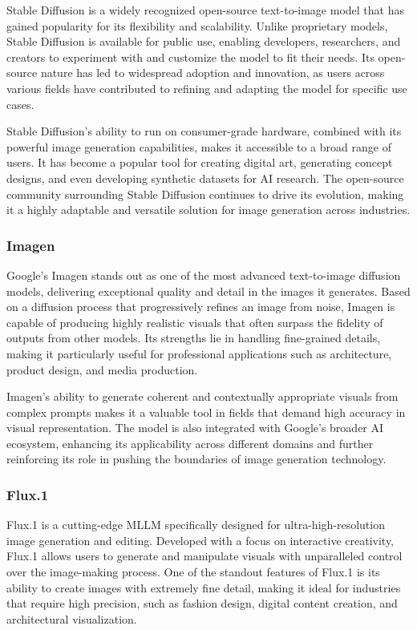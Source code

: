 Stable Diffusion \cite{StableDiffusion} is a widely recognized open-source text-to-image model that has gained popularity for its flexibility and scalability. Unlike proprietary models, Stable Diffusion is available for public use, enabling developers, researchers, and creators to experiment with and customize the model to fit their needs. Its open-source nature has led to widespread adoption and innovation, as users across various fields have contributed to refining and adapting the model for specific use cases.

Stable Diffusion's ability to run on consumer-grade hardware, combined with its powerful image generation capabilities, makes it accessible to a broad range of users. It has become a popular tool for creating digital art, generating concept designs, and even developing synthetic datasets for AI research. The open-source community surrounding Stable Diffusion continues to drive its evolution, making it a highly adaptable and versatile solution for image generation across industries.

\subsubsection{Imagen}

Google's Imagen \cite{Imagen} stands out as one of the most advanced text-to-image diffusion models, delivering exceptional quality and detail in the images it generates. Based on a diffusion process that progressively refines an image from noise, Imagen is capable of producing highly realistic visuals that often surpass the fidelity of outputs from other models. Its strengths lie in handling fine-grained details, making it particularly useful for professional applications such as architecture, product design, and media production.

Imagen's ability to generate coherent and contextually appropriate visuals from complex prompts makes it a valuable tool in fields that demand high accuracy in visual representation. The model is also integrated with Google's broader AI ecosystem, enhancing its applicability across different domains and further reinforcing its role in pushing the boundaries of image generation technology.

\subsubsection{Flux.1}

Flux.1 is a cutting-edge MLLM specifically designed for ultra-high-resolution image generation and editing. Developed with a focus on interactive creativity, Flux.1 allows users to generate and manipulate visuals with unparalleled control over the image-making process. One of the standout features of Flux.1 is its ability to create images with extremely fine detail, making it ideal for industries that require high precision, such as fashion design, digital content creation, and architectural visualization.

